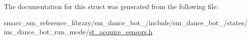 The documentation for this struct was generated from the following file\+:\begin{DoxyCompactItemize}
\item 
smacc\+\_\+sm\+\_\+reference\+\_\+library/sm\+\_\+dance\+\_\+bot\+\_/include/sm\+\_\+dance\+\_\+bot\+\_/states/ms\+\_\+dance\+\_\+bot\+\_\+run\+\_\+mode/\hyperlink{2_2include_2sm__dance__bot__2_2states_2ms__dance__bot__run__mode_2st__acquire__sensors_8h}{st\+\_\+acquire\+\_\+sensors.\+h}\end{DoxyCompactItemize}
